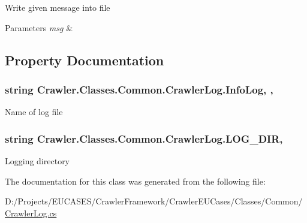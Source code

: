Write given message into file 


\begin{DoxyParams}{Parameters}
{\em msg} & \\
\hline
\end{DoxyParams}


\subsection{Property Documentation}
\hypertarget{class_crawler_1_1_classes_1_1_common_1_1_crawler_log_af825bee79507dc2b1959360884957190}{
\subsubsection[{Info\-Log}]{\setlength{\rightskip}{0pt plus 5cm}string Crawler.\-Classes.\-Common.\-Crawler\-Log.\-Info\-Log\hspace{0.3cm}{\ttfamily [static]}, {\ttfamily [get]}, {\ttfamily [set]}}}\label{class_crawler_1_1_classes_1_1_common_1_1_crawler_log_af825bee79507dc2b1959360884957190}


Name of log file 

\hypertarget{class_crawler_1_1_classes_1_1_common_1_1_crawler_log_a599e0b80ef95d9aeffcb98b2083bdbb4}{
\subsubsection[{L\-O\-G\-\_\-\-D\-I\-R}]{\setlength{\rightskip}{0pt plus 5cm}string Crawler.\-Classes.\-Common.\-Crawler\-Log.\-L\-O\-G\-\_\-\-D\-I\-R\hspace{0.3cm}{\ttfamily [static]}, {\ttfamily [get]}}}\label{class_crawler_1_1_classes_1_1_common_1_1_crawler_log_a599e0b80ef95d9aeffcb98b2083bdbb4}


Logging directory 



The documentation for this class was generated from the following file\-:\begin{DoxyCompactItemize}
\item 
D\-:/\-Projects/\-E\-U\-C\-A\-S\-E\-S/\-Crawler\-Framework/\-Crawler\-E\-U\-Cases/\-Classes/\-Common/\hyperlink{_crawler_e_u_cases_2_classes_2_common_2_crawler_log_8cs}{Crawler\-Log.\-cs}\end{DoxyCompactItemize}
